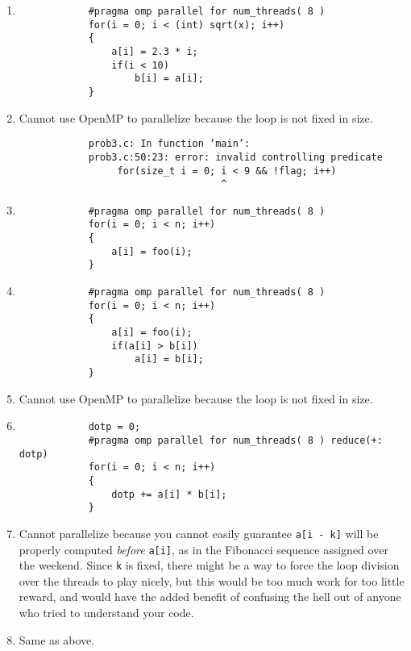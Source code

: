 \documentclass{article}
\begin{document}
    \begin{enumerate}
        \item \begin{verbatim}
            #pragma omp parallel for num_threads( 8 )
            for(i = 0; i < (int) sqrt(x); i++)
            {
                a[i] = 2.3 * i;
                if(i < 10)
                    b[i] = a[i];
            }
        \end{verbatim}

        \item Cannot use OpenMP to parallelize because the loop is not fixed in size.
        \begin{verbatim}
            prob3.c: In function ‘main’:
            prob3.c:50:23: error: invalid controlling predicate
                 for(size_t i = 0; i < 9 && !flag; i++)
                                   ^
        \end{verbatim}

        \item \begin{verbatim}
            #pragma omp parallel for num_threads( 8 )
            for(i = 0; i < n; i++)
            {
                a[i] = foo(i);
            }
        \end{verbatim}

        \item \begin{verbatim}
            #pragma omp parallel for num_threads( 8 )
            for(i = 0; i < n; i++)
            {
                a[i] = foo(i);
                if(a[i] > b[i])
                    a[i] = b[i];
            }
        \end{verbatim}

        \item Cannot use OpenMP to parallelize because the loop is not fixed in size.

        \item \begin{verbatim}
            dotp = 0;
            #pragma omp parallel for num_threads( 8 ) reduce(+: dotp)
            for(i = 0; i < n; i++)
            {
                dotp += a[i] * b[i];
            }
        \end{verbatim}

        \item Cannot parallelize because you cannot easily guarantee \texttt{a[i - k]} will be properly computed \textit{before} \texttt{a[i]}, as in the Fibonacci sequence assigned over the weekend. Since \texttt{k} is fixed, there might be a way to force the loop division over the threads to play nicely, but this would be too much work for too little reward, and would have the added benefit of confusing the hell out of anyone who tried to understand your code.

        \item Same as above.
    \end{enumerate}
\end{document}
